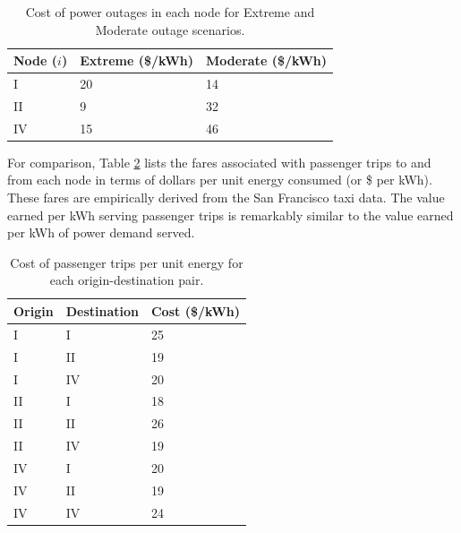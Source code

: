 \documentclass[journal]{IEEEtran}
\begin{document}
\begin{table}[!htbp]
    \renewcommand{\arraystretch}{1}
    \caption{Cost of power outages in each node for Extreme and Moderate outage scenarios.}
    \label{tab:outage_costs}
    \centering
    \def\colmargin{6.75cm}
    \begin{tabular}{lll}
    \hline
    \textbf{Node ($i$)} & \textbf{Extreme} (\$/kWh) & \textbf{Moderate} (\$/kWh) \\
    \hline
    I & 20 & 14 \\
    II & 9  & 32 \\
    IV & 15 & 46 \\
    \hline
    \end{tabular}
\end{table}

For comparison, Table \ref{tab:trip_costs} lists the fares associated with passenger trips to and from each node in terms of dollars per unit energy consumed (or \$ per kWh). These fares are empirically derived from the San Francisco taxi data. The value earned per kWh serving passenger trips is remarkably similar to the value earned per kWh of power demand served.

\begin{table}[!htbp]
    \renewcommand{\arraystretch}{1}
    \caption{Cost of passenger trips per unit energy for each origin-destination pair.}
    \label{tab:trip_costs}
    \centering
    \def\colmargin{6.75cm}
    \begin{tabular}{lll}
    \hline
    \textbf{Origin} & \textbf{Destination} & \textbf{Cost} (\$/kWh) \\
    \hline
    I  & I  & 25 \\
    I  & II & 19 \\
    I  & IV & 20 \\
    II & I  & 18 \\
    II & II & 26 \\
    II & IV & 19 \\
    IV & I  & 20 \\
    IV & II & 19 \\
    IV & IV & 24 \\
    \hline
    \end{tabular}
\end{table}
\end{document}

